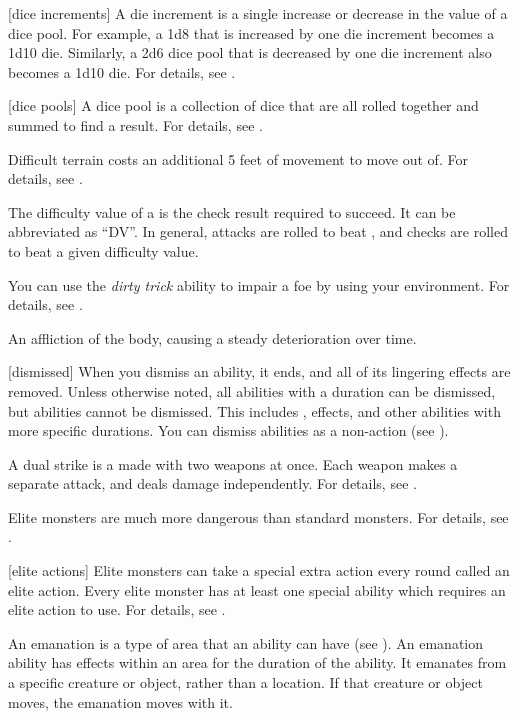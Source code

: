 [dice increments] A die increment is a single increase or decrease in the value of a dice pool.
For example, a 1d8 that is increased by one die increment becomes a 1d10 die.
Similarly, a 2d6 dice pool that is decreased by one die increment also becomes a 1d10 die.
For details, see .

[dice pools] A dice pool is a collection of dice that are all rolled together and summed to find a result.
For details, see .

 Difficult terrain costs an additional 5 feet of movement to move out of.
For details, see .

 The difficulty value of a  is the check result required to succeed.
It can be abbreviated as ``DV''.
In general, attacks are rolled to beat , and checks are rolled to beat a given difficulty value.

 You can use the \textit{dirty trick} ability to impair a foe by using your environment.
For details, see .

 An affliction of the body, causing a steady deterioration over time.

[dismissed] When you dismiss an ability, it ends, and all of its lingering effects are removed.
Unless otherwise noted, all \magical abilities with a duration can be dismissed, but  abilities cannot be dismissed.
This includes ,  effects, and other abilities with more specific durations.
You can dismiss abilities as a non-action (see ).

 A dual strike is a  made with two weapons at once.
Each weapon makes a separate attack, and deals damage independently.
For details, see .

 Elite monsters are much more dangerous than standard monsters.
For details, see .

[elite actions] Elite monsters can take a special extra action every round called an elite action.
Every elite monster has at least one special ability which requires an elite action to use.
For details, see .

 An emanation is a type of area that an ability can have (see ).
An emanation ability has effects within an area for the duration of the ability.
It emanates from a specific creature or object, rather than a location.
If that creature or object moves, the emanation moves with it.

